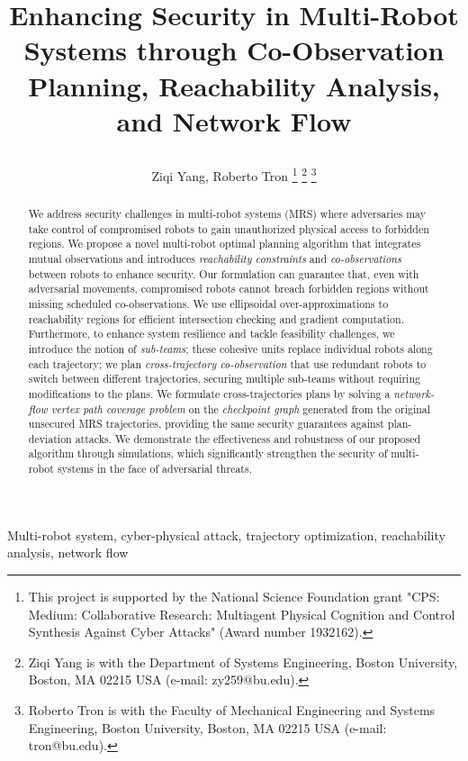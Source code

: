 \documentclass[10pt,twocolumn,twoside]{IEEEtran}
\title{\LARGE \bf

Enhancing Security in Multi-Robot Systems through Co-Observation Planning, Reachability Analysis, and Network Flow}
\author{Ziqi Yang, Roberto Tron \IEEEmembership{Member, IEEE} 
\thanks{This project is supported by the National Science Foundation grant "CPS: Medium: Collaborative Research: Multiagent Physical Cognition and Control Synthesis Against Cyber Attacks" (Award number 1932162).}
\thanks{Ziqi Yang is with the Department of Systems Engineering,
Boston University, Boston, MA 02215 USA (e-mail: zy259@bu.edu).
}
\thanks{Roberto Tron is with the Faculty of Mechanical Engineering and Systems Engineering, Boston University, Boston, MA 02215 USA (e-mail:
tron@bu.edu).}}
\begin{document}
\maketitle
\thispagestyle{empty}
\pagestyle{empty}




\begin{abstract}
We address security challenges in multi-robot systems (MRS) where adversaries may take control of compromised robots to gain unauthorized physical access to forbidden regions. We propose a novel multi-robot optimal planning algorithm that integrates mutual observations and introduces \emph{reachability constraints} and \emph{co-observations} between robots to enhance security. Our formulation can guarantee that, even with adversarial movements, compromised robots cannot breach forbidden regions without missing scheduled co-observations. We use ellipsoidal over-approximations to reachability regions for efficient intersection checking and gradient computation. Furthermore, to enhance system resilience and tackle feasibility challenges, we introduce the notion of \emph{sub-teams}; these cohesive units replace individual robots along each trajectory; we plan \emph{cross-trajectory co-observation} that use redundant robots to switch between different trajectories, securing multiple sub-teams without requiring modifications to the plans. We formulate cross-trajectories plans by solving a \emph{network-flow vertex path coverage problem} on the \emph{checkpoint graph} generated from the original unsecured MRS trajectories, providing the same security guarantees against plan-deviation attacks. We demonstrate the effectiveness and robustness of our proposed algorithm through simulations, which significantly strengthen the security of multi-robot systems in the face of adversarial threats.
\end{abstract}
\begin{IEEEkeywords}
  Multi-robot system, cyber-physical attack, trajectory optimization, reachability analysis, network flow
\end{IEEEkeywords}
\end{document}
